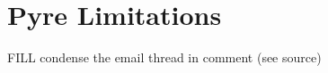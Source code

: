 \documentclass[english,cleveref,submission]{programming}
\begin{document}
\section{Pyre Limitations}

FILL condense the email thread in comment (see source)

\end{document}
